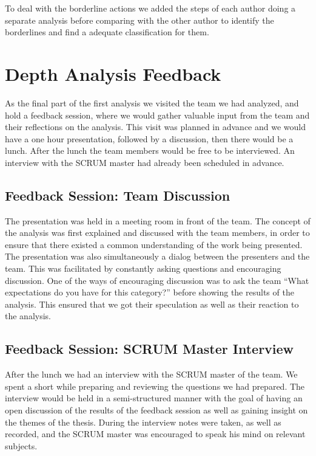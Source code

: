 To deal with the borderline actions we added the steps of each author doing a separate analysis before comparing with the other author to identify the borderlines and find a adequate classification for them.


\section{Depth Analysis Feedback}
As the final part of the first analysis we visited the team we had analyzed, and hold a feedback session, where we would gather valuable input from the team and their reflections on the analysis. This visit was planned in advance and we would have a one hour presentation, followed by a discussion, then there would be a lunch. After the lunch the team members would be free to be interviewed. An interview with the SCRUM master had already been scheduled in advance.

\subsection{Feedback Session: Team Discussion}
The presentation was held in a meeting room in front of the team. The concept of the analysis was first explained and discussed with the team members, in order to ensure that there existed a common understanding of the work being presented. The presentation was also simultaneously a dialog between the presenters and the team. This was facilitated by constantly asking questions and encouraging discussion. One of the ways of encouraging discussion was to ask the team ``What expectations do you have for this category?'' before showing the results of the analysis. This ensured that we got their speculation as well as their reaction to the analysis. 

\subsection{Feedback Session: SCRUM Master Interview}
After the lunch we had an interview with the SCRUM master of the team. We spent a short while preparing and reviewing the questions we had prepared. The interview would be held in a semi-structured manner with the goal of having an open discussion of the results of the feedback session as well as gaining insight on the themes of the thesis. During the interview notes were taken, as well as recorded, and the SCRUM master was encouraged to speak his mind on relevant subjects. 

